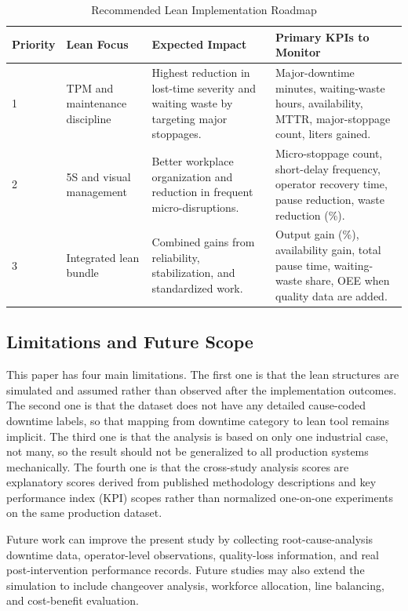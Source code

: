 \documentclass[12pt,a4paper]{article}
\begin{document}
\begin{table}[H]
\centering
\caption{Recommended Lean Implementation Roadmap}
\begin{tabular}{p{1.3cm}p{2.6cm}p{4.0cm}p{5.2cm}}
\toprule
\textbf{Priority} & \textbf{Lean Focus} & \textbf{Expected Impact} & \textbf{Primary KPIs to Monitor} \\
\midrule
1 & TPM and maintenance discipline & Highest reduction in lost-time severity and waiting waste by targeting major stoppages. & Major-downtime minutes, waiting-waste hours, availability, MTTR, major-stoppage count, liters gained. \\
2 & 5S and visual management & Better workplace organization and reduction in frequent micro-disruptions. & Micro-stoppage count, short-delay frequency, operator recovery time, pause reduction, waste reduction (\%). \\
3 & Integrated lean bundle & Combined gains from reliability, stabilization, and standardized work. & Output gain (\%), availability gain, total pause time, waiting-waste share, OEE when quality data are added. \\
\bottomrule
\end{tabular}
\end{table}

\subsection{Limitations and Future Scope}
This paper has four main limitations. The first one is that the lean structures are simulated and assumed rather than observed after the implementation outcomes. The second one is that the dataset does not have any detailed cause-coded downtime labels, so that mapping from downtime category to lean tool remains implicit. The third one is that the analysis is based on only one industrial case, not many, so the result should not be generalized to all production systems mechanically. The fourth one is that the cross-study analysis scores are explanatory scores derived from published methodology descriptions and key performance index (KPI) scopes rather than normalized one-on-one experiments on the same production dataset.

Future work can improve the present study by collecting root-cause-analysis downtime data, operator-level observations, quality-loss information, and real post-intervention performance records. Future studies may also extend the simulation to include changeover analysis, workforce allocation, line balancing, and cost-benefit evaluation.
\end{document}
